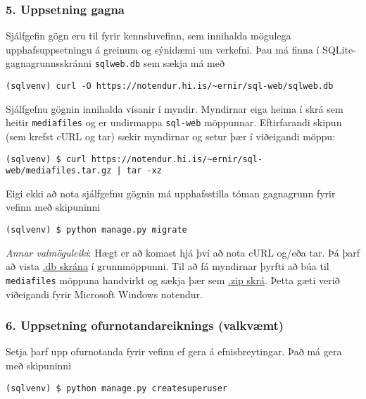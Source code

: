 \subsubsection{5. Uppsetning gagna}\label{uppsetning-gagna}

Sjálfgefin gögn eru til fyrir kennsluvefinn, sem innihalda mögulega
upphafsuppsetningu á greinum og sýnidæmi um verkefni. Þau má finna í
SQLite-gagnagrunnsskránni \texttt{sqlweb.db} sem sækja má með

\begin{verbatim}
(sqlvenv) curl -O https://notendur.hi.is/~ernir/sql-web/sqlweb.db
\end{verbatim}

Sjálfgefnu gögnin innihalda vísanir í myndir. Myndirnar eiga heima í
skrá sem heitir \texttt{mediafiles} og er undirmappa \texttt{sql-web}
möppunnar. Eftirfarandi skipun (sem krefst cURL og tar) sækir myndirnar
og setur þær í viðeigandi möppu:

\begin{verbatim}
(sqlvenv) $ curl https://notendur.hi.is/~ernir/sql-web/mediafiles.tar.gz | tar -xz
\end{verbatim}

Eigi ekki að nota sjálfgefnu gögnin má upphafsstilla tóman gagnagrunn
fyrir vefinn með skipuninni

\begin{verbatim}
(sqlvenv) $ python manage.py migrate
\end{verbatim}

\emph{Annar valmöguleiki}: Hægt er að komast hjá því að nota cURL og/eða
tar. Þá þarf að vista
\href{https://notendur.hi.is/~ernir/sql-web/sqlweb.db}{.db skrána} í
grunnmöppunni. Til að fá myndirnar þyrfti að búa til \texttt{mediafiles}
möppuna handvirkt og sækja þær sem
\href{https://notendur.hi.is/~ernir/sql-web/mediafiles.zip}{.zip skrá}.
Þetta gæti verið viðeigandi fyrir Microsoft Windows notendur.


\subsubsection{6. Uppsetning ofurnotandareiknings
(valkvæmt)}\label{uppsetning-ofurnotandareiknings-valkvuxe6mt}

Setja þarf upp ofurnotanda fyrir vefinn ef gera á efnisbreytingar. Það
má gera með skipuninni

\begin{verbatim}
(sqlvenv) $ python manage.py createsuperuser
\end{verbatim}

